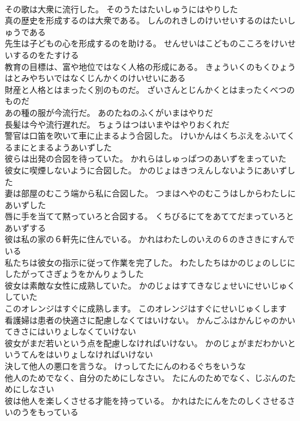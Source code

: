 \documentclass[8pt]{extreport}
\begin{document}
\begin{CJK}{UTF8}{min}
\\	その歌は大衆に流行した。	そのうたはたいしゅうにはやりした 
\\	真の歴史を形成するのは大衆である。	しんのれきしのけいせいするのはたいしゅうである 
\\	先生は子どもの心を形成するのを助ける。	せんせいはこどものこころをけいせいするのをたすける 
\\	教育の目標は、富や地位ではなく人格の形成にある。	きょういくのもくひょうはとみやちいではなくじんかくのけいせいにある 
\\	財産と人格とはまったく別のものだ。	ざいさんとじんかくとはまったくべつのものだ 
\\	あの種の服が今流行だ。	あのたねのふくがいまはやりだ 
\\	長髪は今や流行遅れだ。	ちょうはつはいまやはやりおくれだ 
\\	警官は口笛を吹いて車に止まるよう合図した。	けいかんはくちぶえをふいてくるまにとまるようあいずした 
\\	彼らは出発の合図を待っていた。	かれらはしゅっぱつのあいずをまっていた 
\\	彼女に喫煙しないように合図した。	かのじょはきつえんしないようにあいずした 
\\	妻は部屋のむこう端から私に合図した。	つまはへやのむこうはしからわたしにあいずした 
\\	唇に手を当てて黙っていろと合図する。	くちびるにてをあててだまっていろとあいずする 
\\	彼は私の家の６軒先に住んでいる。	かれはわたしのいえの６のきさきにすんでいる 
\\	私たちは彼女の指示に従って作業を完了した。	わたしたちはかのじょのしじにしたがってさぎょうをかんりょうした 
\\	彼女は素敵な女性に成熟していた。	かのじょはすてきなじょせいにせいじゅくしていた 
\\	このオレンジはすぐに成熟します。	このオレンジはすぐにせいじゅくします 
\\	看護婦は患者の快適さに配慮しなくてはいけない。	かんごふはかんじゃのかいてきさにはいりょしなくていけない 
\\	彼女がまだ若いという点を配慮しなければいけない。	かのじょがまだわかいというてんをはいりょしなければいけない 
\\	決して他人の悪口を言うな。	けっしてたにんのわるぐちをいうな 
\\	他人のためでなく、自分のためにしなさい。	たにんのためでなく、じぶんのためにしなさい 
\\	彼は他人を楽しくさせる才能を持っている。	かれはたにんをたのしくさせるさいのうをもっている 

\end{CJK}
\end{document}
